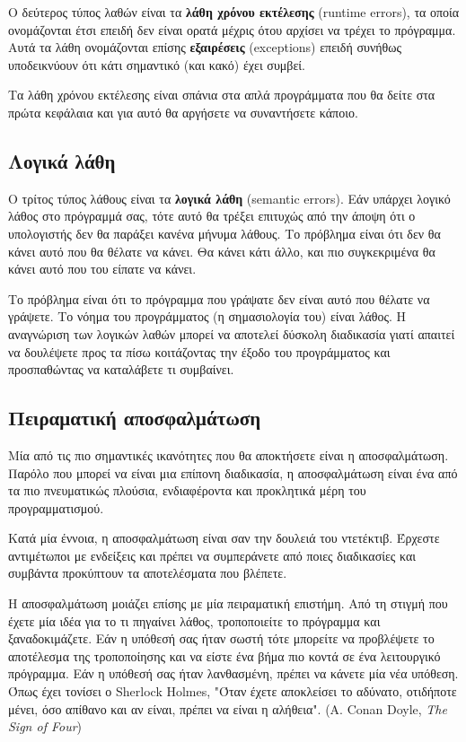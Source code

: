 \documentclass[10pt]{book}
\begin{document}
Ο δεύτερος τύπος λαθών είναι τα {\bf λάθη χρόνου εκτέλεσης} (runtime errors),
τα οποία ονομάζονται έτσι επειδή δεν είναι ορατά μέχρις ότου αρχίσει να τρέχει το πρόγραμμα. Αυτά τα λάθη ονομάζονται επίσης {\bf εξαιρέσεις} (exceptions) επειδή συνήθως υποδεικνύουν ότι κάτι σημαντικό (και κακό) έχει συμβεί.

Τα λάθη χρόνου εκτέλεσης είναι σπάνια στα απλά προγράμματα που θα δείτε
στα πρώτα κεφάλαια και για αυτό θα αργήσετε να συναντήσετε κάποιο.

\subsection{Λογικά λάθη}

Ο τρίτος τύπος λάθους είναι τα {\bf λογικά λάθη} (semantic errors). Εάν υπάρχει λογικό λάθος στο πρόγραμμά σας, τότε αυτό θα τρέξει επιτυχώς από την άποψη ότι ο υπολογιστής δεν θα παράξει κανένα μήνυμα λάθους. Το πρόβλημα είναι ότι δεν θα κάνει αυτό που θα θέλατε να κάνει. Θα κάνει κάτι άλλο, και πιο συγκεκριμένα θα κάνει αυτό που του είπατε να κάνει.

Το πρόβλημα είναι ότι το πρόγραμμα που γράψατε δεν είναι αυτό
που θέλατε να γράψετε. Το νόημα του προγράμματος (η σημασιολογία του)
είναι λάθος. Η αναγνώριση των λογικών λαθών μπορεί να αποτελεί δύσκολη διαδικασία γιατί απαιτεί να δουλέψετε προς τα πίσω κοιτάζοντας την έξοδο του προγράμματος και προσπαθώντας να καταλάβετε τι συμβαίνει.

\subsection{Πειραματική αποσφαλμάτωση}

Μία από τις πιο σημαντικές ικανότητες που θα αποκτήσετε είναι
η αποσφαλμάτωση. Παρόλο που μπορεί να είναι μια επίπονη διαδικασία,
η αποσφαλμάτωση είναι ένα από τα πιο πνευματικώς πλούσια, ενδιαφέροντα 
και προκλητικά μέρη του προγραμματισμού.


Κατά μία έννοια, η αποσφαλμάτωση είναι σαν την δουλειά του ντετέκτιβ.  
Έρχεστε αντιμέτωποι με ενδείξεις και πρέπει να συμπεράνετε από ποιες
διαδικασίες και συμβάντα προκύπτουν τα αποτελέσματα που βλέπετε.

Η αποσφαλμάτωση μοιάζει επίσης με μία πειραματική επιστήμη. Από τη στιγμή
που έχετε μία ιδέα για το τι πηγαίνει λάθος, τροποποιείτε το πρόγραμμα και
ξαναδοκιμάζετε. Εάν η υπόθεσή σας ήταν σωστή τότε μπορείτε να προβλέψετε
το αποτέλεσμα της τροποποίησης και να είστε ένα βήμα πιο κοντά σε ένα
λειτουργικό πρόγραμμα.  Εάν η υπόθεσή σας ήταν λανθασμένη, πρέπει να κάνετε
μία νέα υπόθεση.  Όπως έχει τονίσει ο  Sherlock Holmes, "Όταν έχετε
αποκλείσει το αδύνατο, οτιδήποτε μένει, όσο απίθανο και αν είναι, πρέπει να
είναι η αλήθεια". (A. Conan Doyle, {\em The Sign of Four})
\end{document}
